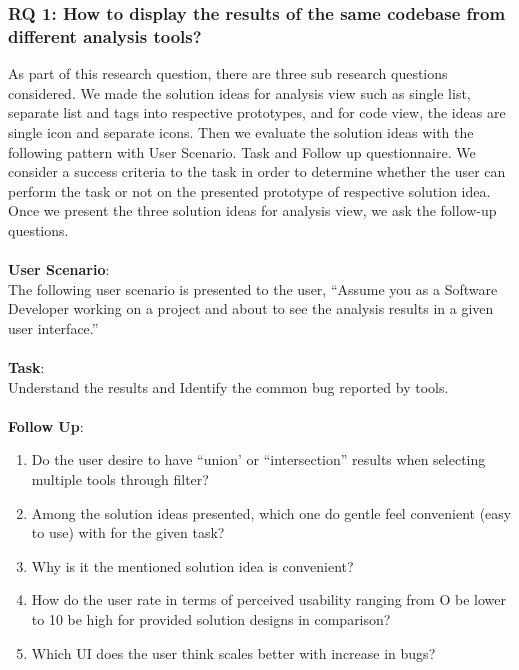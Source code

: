 \subsubsection{RQ 1: How to display the results of the same codebase from different analysis tools?}

As part of this research question, there are three sub research questions considered. We made the solution ideas for analysis view such as single list, separate list and tags into respective prototypes, and for code view, the ideas are single icon and separate icons. Then we evaluate the solution ideas with the following pattern with User Scenario. Task and Follow up questionnaire. We consider a success criteria to the task in order to determine whether the user can perform the task or not on the presented prototype of respective solution idea. Once we present the three solution ideas for analysis view, we ask the follow-up questions. \\ \\

\textbf{User Scenario}: \\

The following user scenario is presented to the user, “Assume you as a Software Developer working on a project and about to see the analysis results in a given user interface.” \\ \\

\textbf{Task}: \\

Understand the results and Identify the common bug reported by tools. \\ \\

\textbf{Follow Up}: \\

\begin{enumerate}
\item Do the user desire to have “union’ or “intersection” results when selecting multiple tools through filter? 
\item Among the solution ideas presented, which one do gentle feel convenient (easy to use) with for the given task?
\item Why is it the mentioned solution idea is convenient?
\item How do the user rate in terms of perceived usability ranging from O be lower to 10 be high for provided solution designs in comparison?
\item Which UI does the user think scales better with increase in bugs? \\
\end{enumerate}

